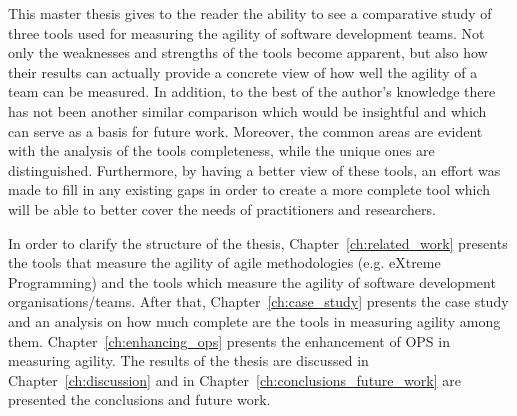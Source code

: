 This master thesis gives to the reader the ability to see a comparative study of three tools used for measuring the agility of software development teams. Not only the weaknesses and strengths of the tools become apparent, but also how their results can actually provide a concrete view of how well the agility of a team can be measured. In addition, to the best of the author's knowledge there has not been another similar comparison which would be insightful and which can serve as a basis for future work. Moreover, the common areas are evident with the analysis of the tools completeness, while the unique ones are distinguished. Furthermore, by having a better view of these tools, an effort was made to fill in any existing gaps in order to create a more complete tool which will be able to better cover the needs of practitioners and researchers.

In order to clarify the structure of the thesis,  Chapter~\ref{ch:related_work} presents the tools that measure the agility of agile methodologies (e.g. eXtreme Programming) and the tools which measure the agility of software development organisations/teams. After that, Chapter~\ref{ch:case_study} presents the case study and an analysis on how much complete are the tools in measuring agility among them. Chapter~\ref{ch:enhancing_ops} presents the enhancement of OPS in measuring agility. The results of the thesis are discussed in Chapter~\ref{ch:discussion} and in Chapter~\ref{ch:conclusions_future_work} are presented the conclusions and future work. 



